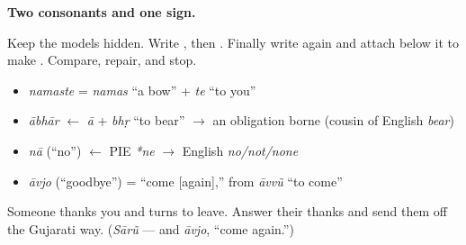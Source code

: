 \textbf{Two consonants and one sign.}

Keep the models hidden. Write \textbf{}, then \textbf{}. Finally write \textbf{} again and attach \textbf{} below it to make \textbf{}. Compare, repair, and stop.

\begin{grammarlens}[title={What you've built — roots you now carry}]
\begin{itemize}
\raggedright
  \item \emph{namaste} = \emph{namas} \textquotedblleft{}a bow\textquotedblright{} + \emph{te} \textquotedblleft{}to you\textquotedblright{}
  \item \emph{ābhār} $\leftarrow$ \emph{ā} + \emph{bhṛ} \textquotedblleft{}to bear\textquotedblright{} $\to$ an obligation borne (cousin of English \emph{bear})
  \item \emph{nā} (\textquotedblleft{}no\textquotedblright{}) $\leftarrow$ PIE \emph{*ne} $\to$ English \emph{no/not/none}
  \item \emph{āvjo} (\textquotedblleft{}goodbye\textquotedblright{}) = \textquotedblleft{}come {[}again{]},\textquotedblright{} from \emph{āvvũ} \textquotedblleft{}to come\textquotedblright{}
\end{itemize}
\end{grammarlens}

\begin{tcolorbox}[breakable,colback=teal!4,colframe=teal!35!black,title={Before you move on}]
Someone thanks you and turns to leave. Answer their thanks and send them off the Gujarati way. (\emph{Sārũ} — and \emph{āvjo}, \textquotedblleft{}come again.\textquotedblright{})
\end{tcolorbox}
